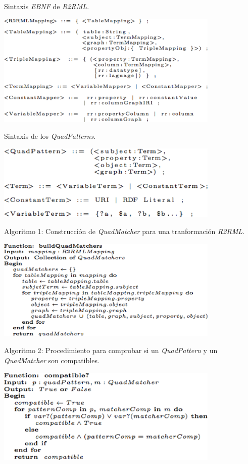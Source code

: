 \begin{table}
\vspace{2.4in}
\caption{Sintaxis \textit{EBNF} de \textit{R2RML}.}
\includegraphics[width=0.8\textwidth]{tabla10}
\label{tabla10}
\end{table}
\clearpage
\newpage


\begin{table}
\vspace{2.4in}
\caption{Sintaxis de los \textit{QuadPatterns}.}
\includegraphics[width=0.8\textwidth]{tabla11}
\label{tabla11}
\end{table}
\clearpage
\newpage


\begin{table}
\vspace{2.4in}
\caption{Algoritmo 1: Construcci\'on de \textit{QuadMatcher} para una tranformaci\'on \textit{R2RML}.}
\includegraphics[width=0.8\textwidth]{algoritmo1}
\label{alg1}
\end{table}
\clearpage
\newpage


\begin{table}
\vspace{2.4in}
\caption{Algoritmo 2: Procedimiento para comprobar si un \textit{QuadPattern} y un \textit{QuadMatcher} son compatibles.}
\includegraphics[width=0.8\textwidth]{algoritmo2}
\label{alg2}
\end{table}
\clearpage
\newpage

